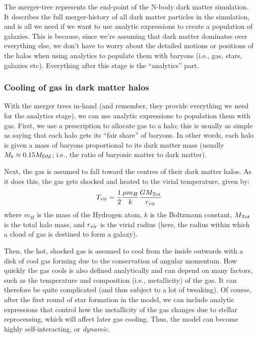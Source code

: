 \documentclass[11pt]{article}
\begin{document}
The merger-tree represents the end-point of the N-body dark matter
simulation. It describes the full merger-history of all dark matter
particles in the simulation, and is all we need if we want to use
analytic expressions to create a population of galaxies. This is
because, since we're assuming that dark matter dominates over
everything else, we don't have to worry about the detailed motions or
positions of the halos when using analytics to populate them with
baryons (i.e., gas, stars, galaxies etc). Everything after this stage
is the ``analytics'' part.

\subsubsection{Cooling of gas in dark matter halos}
With the merger trees in-hand (and remember, they provide everything
we need for the analytics stage), we can use analytic expressions to
population them with gas. First, we use a prescription to allocate gas
to a halo; this is usually as simple as saying that each halo gets its
``fair share'' of baryons. In other words, each halo is given a mass
of baryons proportional to its dark matter mass (usually
$M_b \approx 0.15M_{\rm DM}$; i.e., the ratio of baryonic matter to
dark matter).

Next, the gas is assumed to fall toward the centres of their dark
matter halos. As it does this, the gas gets shocked and heated to the
virial temperature, given by:
\begin{equation}
T_{\rm vir} = \frac{1}{2}\frac{\mu m_H}{k}\frac{GM_{\rm Tot}}{r_{\rm vir}}
\end{equation}
where $m_H$ is the mass of the Hydrogen atom, $k$ is the Boltzmann
constant, $M_{\rm Tot}$ is the total halo mass, and $r_{\rm vir}$ is
the virial radius (here, the radius within which a cloud of gas is
destined to form a galaxy).

Then, the hot, shocked gas is assumed to cool from the inside outwards
with a disk of cool gas forming due to the conservation of angular
momentum. How quickly the gas cools is also defined analytically and
can depend on many factors, such as the temperature and composition
(i.e., metallicity) of the gas. It can therefore be quite complicated
(and thus subject to a lot of tweaking). Of course, after the first
round of star formation in the model, we can include analytic
expressions that control how the metallicity of the gas changes due to
stellar reprocessing, which will affect later gas cooling. Thus, the
model can become highly self-interacting, or {\it dynamic}.
\end{document}
